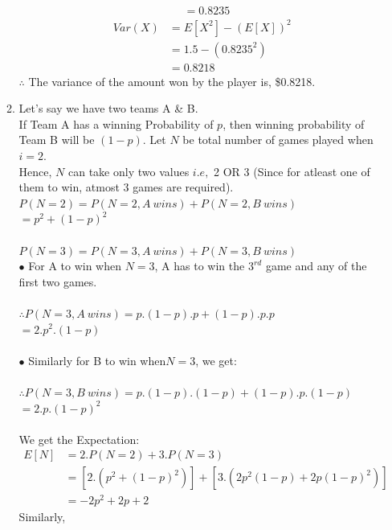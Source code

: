 \documentclass{article}
\begin{document}
\begin{enumerate}
\begin{enumerate}
\begin{align*}
            &= 0.8235
        \end{align*}
        \begin{align*}
            Var(X) &= E[X^2] - (E[X])^2\\
            &= 1.5 - (0.8235^2)\\
            &= 0.8218
        \end{align*}
        \(\therefore\) The variance of the amount won by the player is, \$0.8218.\\
    \item
        Let's say we have two teams A \& B.\\
        If Team A has a winning Probability of \(p\), then winning probability of Team B will be \((1-p)\).
        Let \(N\) be total number of games played when \(i=2\).\\
        Hence, \(N\) can take only two values \(i.e,\) 2 OR 3 (Since for atleast one of them to win, atmost 3 games are required).\\
        \(P(N=2) = P(N=2, A\ wins) + P(N=2, B\ wins)\)\\
        \(= p^2 + (1-p)^2\)\\\\
        \(P(N=3) = P(N=3, A\ wins) + P(N=3, B\ wins)\)\\
        $\bullet$ For A to win when \(N=3\), A has to win the \(3^{rd}\) game and any of the first two games.\\\\
        \(\therefore P(N=3, A\ wins) = p.(1-p).p + (1-p).p.p\)\\
        \(=2.p^2.(1-p)\)\\\\
        $\bullet$ Similarly for B to win when\(N=3\), we get:\\\\
        \(\therefore P(N=3, B\ wins) = p.(1-p).(1-p) + (1-p).p.(1-p)\)\\
        \(=2.p.(1-p)^2\)\\\\
        We get the Expectation:
        \begin{align*}
            E[N] &= 2.P(N=2) + 3.P(N=3)\\
            &= \left[2.\left(p^2 + (1-p)^2\right)\right] + \left[3.\left(2p^2(1-p) + 2p(1-p)^2\right)\right]\\
            &= -2p^2 + 2p + 2
        \end{align*}
        Similarly,
        \begin{align*}

\end{align*}
\end{enumerate}
\end{enumerate}
\end{document}
